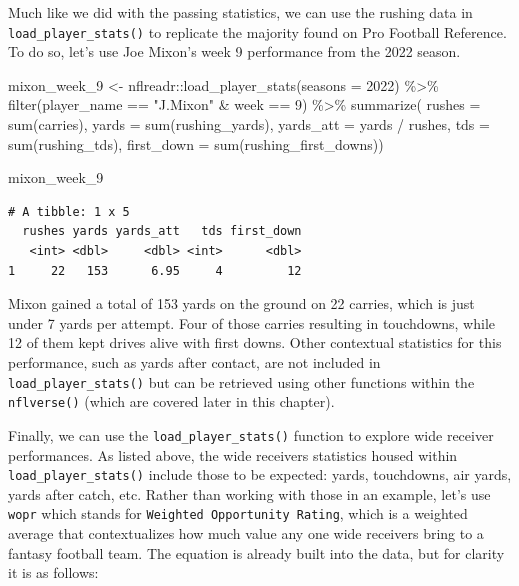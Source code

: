 \documentclass[
  letterpaper,
]{krantz}
\newenvironment{Shaded}{\begin{snugshade}}{\end{snugshade}}
\newcommand{\AttributeTok}[1]{\textcolor[rgb]{0.40,0.45,0.13}{#1}}
\newcommand{\DecValTok}[1]{\textcolor[rgb]{0.68,0.00,0.00}{#1}}
\newcommand{\FunctionTok}[1]{\textcolor[rgb]{0.28,0.35,0.67}{#1}}
\newcommand{\NormalTok}[1]{\textcolor[rgb]{0.00,0.23,0.31}{#1}}
\newcommand{\OtherTok}[1]{\textcolor[rgb]{0.00,0.23,0.31}{#1}}
\newcommand{\SpecialCharTok}[1]{\textcolor[rgb]{0.37,0.37,0.37}{#1}}
\newcommand{\StringTok}[1]{\textcolor[rgb]{0.13,0.47,0.30}{#1}}
\begin{document}
Much like we did with the passing statistics, we can use the rushing
data in \texttt{load\_player\_stats()} to replicate the majority found
on Pro Football Reference. To do so, let's use Joe Mixon's week 9
performance from the 2022 season.

\begin{Shaded}
\begin{Highlighting}[]
\NormalTok{mixon\_week\_9 }\OtherTok{\textless{}{-}}\NormalTok{ nflreadr}\SpecialCharTok{::}\FunctionTok{load\_player\_stats}\NormalTok{(}\AttributeTok{seasons =} \DecValTok{2022}\NormalTok{) }\SpecialCharTok{\%\textgreater{}\%}
  \FunctionTok{filter}\NormalTok{(player\_name }\SpecialCharTok{==} \StringTok{"J.Mixon"} \SpecialCharTok{\&}\NormalTok{ week }\SpecialCharTok{==} \DecValTok{9}\NormalTok{) }\SpecialCharTok{\%\textgreater{}\%}
  \FunctionTok{summarize}\NormalTok{(}
    \AttributeTok{rushes =} \FunctionTok{sum}\NormalTok{(carries),}
    \AttributeTok{yards =} \FunctionTok{sum}\NormalTok{(rushing\_yards),}
    \AttributeTok{yards\_att =}\NormalTok{ yards }\SpecialCharTok{/}\NormalTok{ rushes,}
    \AttributeTok{tds =} \FunctionTok{sum}\NormalTok{(rushing\_tds),}
    \AttributeTok{first\_down =} \FunctionTok{sum}\NormalTok{(rushing\_first\_downs))}

\NormalTok{mixon\_week\_9}
\end{Highlighting}
\end{Shaded}

\begin{verbatim}
# A tibble: 1 x 5
  rushes yards yards_att   tds first_down
   <int> <dbl>     <dbl> <int>      <dbl>
1     22   153      6.95     4         12
\end{verbatim}

Mixon gained a total of 153 yards on the ground on 22 carries, which is
just under 7 yards per attempt. Four of those carries resulting in
touchdowns, while 12 of them kept drives alive with first downs. Other
contextual statistics for this performance, such as yards after contact,
are not included in \texttt{load\_player\_stats()} but can be retrieved
using other functions within the \texttt{nflverse()} (which are covered
later in this chapter).

Finally, we can use the \texttt{load\_player\_stats()} function to
explore wide receiver performances. As listed above, the wide receivers
statistics housed within \texttt{load\_player\_stats()} include those to
be expected: yards, touchdowns, air yards, yards after catch, etc.
Rather than working with those in an example, let's use \texttt{wopr}
which stands for \texttt{Weighted\ Opportunity\ Rating}, which is a
weighted average that contextualizes how much value any one wide
receivers bring to a fantasy football team. The equation is already
built into the data, but for clarity it is as follows:
\end{document}
